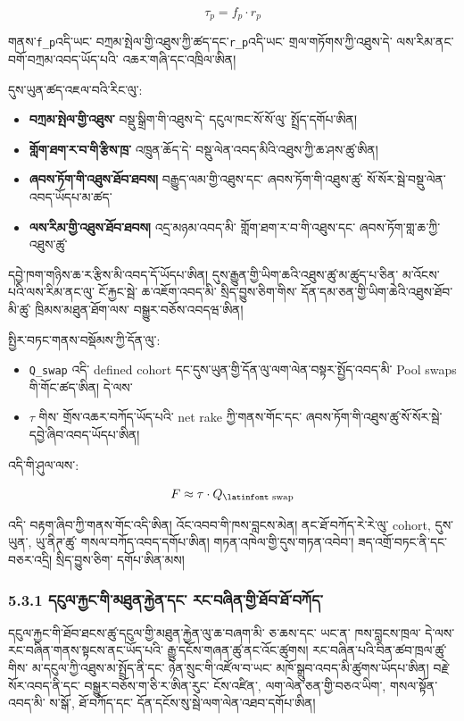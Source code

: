 \documentclass[11pt]{article}
\begin{document}
\[
\tau_p = f_p \cdot r_p
\]

གནས་\texttt{f\_p}འདི་ཡང་ བཀྲམ་སྤེལ་གྱི་འཐུས་ཀྱི་ཚད་དང་\texttt{r\_p}འདི་ཡང་ གྲལ་གཏོགས་ཀྱི་འཐུས་དེ་ ལས་རིམ་ནང་ བགོ་བཀྲམ་འབད་ཡོད་པའི་ འཆར་གཞི་དང་འཁྲིལ་ཨིན།

དུས་ཡུན་ཚད་འཇལ་བའི་རིང་ལུ་:

\begin{itemize}[leftmargin=*]
\item \textbf{བཀྲམ་སྤེལ་གྱི་འཐུས་} བསྡུ་སྒྲིག་གི་འཐུས་དེ་ དངུལ་ཁང་སོ་སོ་ལུ་ སྤྲོད་དགོཔ་ཨིན།
\item \textbf{གློག་ཐག་ར་བ་གི་རྩིས་ཁྲ་} འཁྲུན་ཆོད་དེ་ བསྡུ་ལེན་འབད་མིའི་འཐུས་ཀྱི་ཆ་ཤས་ཚུ་ཨིན།
\item \textbf{ཞབས་ཏོག་གི་འཐུས་ཐོབ་ཐབས།} བརྒྱུད་ལམ་གྱི་འཐུས་དང་ ཞབས་ཏོག་གི་འཐུས་ཚུ་ སོ་སོར་སྦེ་བསྡུ་ལེན་འབད་ཡོདཔ་མ་ཚད་
\item \textbf{ལས་རིམ་གྱི་འཐུས་ཐོབ་ཐབས།} འདྲ་མཉམ་འབད་མི་ གློག་ཐག་ར་བ་གི་འཐུས་དང་ ཞབས་ཏོག་གླ་ཆ་ཀྱི་འཐུས་ཚུ་
\end{itemize}
དབྱེ་ཁག་གཉིས་ཆ་ར་རྩིས་མི་འབད་དོ་ཡོདཔ་ཨིན། དུས་རྒྱུན་གྱི་ཡིག་ཆའི་འཐུས་ཚུ་མ་ཚུད་པ་ཅིན་ མ་འོངས་པའི་ལས་རིམ་ནང་ལུ་ ངོ་རྐྱང་སྦེ་ ཆ་འཇོག་འབད་མི་ སྲིད་བྱུས་ཅིག་གིས་ དོན་དམ་ཅན་གྱི་ཡིག་ཆེའི་འཐུས་ཐོབ་མི་ཚུ་ ཁྲིམས་མཐུན་ཐོག་ལས་ བསྒྱུར་བཅོས་འབདཝ་ཨིན།

སྤྱིར་བཏང་གནས་བསྡོམས་ཀྱི་དོན་ལུ་:

\begin{itemize}[leftmargin=*]
\item \texttt{Q\_swap} འདི་ defined cohort དང་དུས་ཡུན་གྱི་དོན་ལུ་ལག་ལེན་བསྟར་སྤྱོད་འབད་མི་ Pool swaps གི་གོང་ཚད་ཨིན། དེ་ལས་
\item \texttt{$\tau$} གིས་ གྲོས་འཆར་བཀོད་ཡོད་པའི་ net rake ཀྱི་གནས་གོང་དང་ ཞབས་ཏོག་གི་འཐུས་ཚུ་སོ་སོར་སྦེ་དབྱེ་ཞིབ་འབད་ཡོདཔ་ཨིན།
\end{itemize}
འདི་གི་ཤུལ་ལས་:

\[
F \approx \tau \cdot Q_{\text{\latinfont swap}}
\]

འདི་ བརྟག་ཞིབ་ཀྱི་གནས་གོང་འདི་ཨིན། འོང་འབབ་གི་ཁས་བླངས་མེན། ནང་ཐོ་བཀོད་རེ་རེ་ལུ་ cohort, དུས་ཡུན་, ཡུ་ནིཊ་ཚུ་ གསལ་བཀོད་འབད་དགོཔ་ཨིན། གཏན་འཁེལ་གྱི་དུས་གཏན་འབེབ་། ཟད་འགྲོ་བཏང་ནི་དང་ བཅར་འདྲི། སྲིད་བྱུས་ཅིག་ དགོཔ་ཨིན་མས།

\subsubsection*{5.3.1 དངུལ་རྐྱང་གི་མཐུན་རྐྱེན་དང་ རང་བཞིན་གྱི་ཐོབ་ཐོ་བཀོད་}

དངུལ་རྐྱང་གི་ཐོབ་ཐངས་ཚུ་དངུལ་གྱི་མཐུན་རྐྱེན་ལུ་ཆ་བཞག་མི་ ཅ་ཆས་དང་ ཡང་ན་ ཁས་བླངས་ཁྲལ་ དེ་ལས་ རང་བཞིན་གནས་སྟངས་ནང་ཡོད་པའི་ རྒྱུ་དངོས་གཞན་ཚུ་ནང་འོང་ཚུགས། རང་བཞིན་པའི་བིན་ཚབ་ཁྲལ་ཚུ་གིས་ མ་དངུལ་ཀྱི་འཐུས་མ་སྤྲོད་ནི་དང་ ཉེན་སྲུང་གི་འཛོལ་བ་ཡང་ མཁོ་སྒྲུབ་འབད་མི་ཚུགས་ཡོདཔ་ཨིན། བརྗེ་སོར་འབད་ནི་དང་ བསྒྱུར་བཅོས་ག་ཅི་ར་ཨིན་རུང་ ངོས་འཛིན་, ལག་ལེན་ཅན་གྱི་བཅའ་ཡིག་, གསལ་སྟོན་འབད་མི་ ས་སྒོ་, ཐོ་བཀོད་དང་ དོན་དངོས་སུ་སྦེ་ལག་ལེན་འཐབ་དགོཔ་ཨིན།
\end{document}
